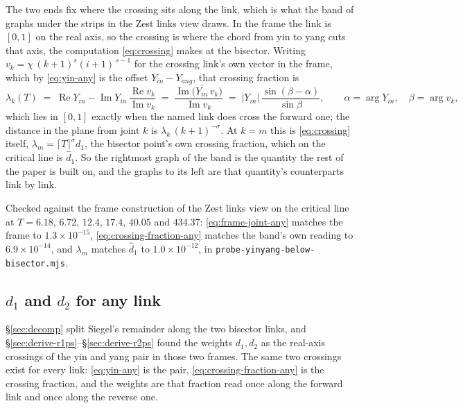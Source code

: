 \documentclass[11pt]{article}
\theoremstyle{definition}
\begin{document}
The two ends fix where the crossing sits along the link, which is what the band
of graphs under the strips in the Zest links view draws. In the frame the link
is $[0,1]$ on the real axis, so the crossing is where the chord from yin to
yang cuts that axis, the computation \eqref{eq:crossing} makes at the bisector.
Writing $v_k=\chi\,(k+1)^{s}(i+1)^{\,s-1}$ for the crossing link's own vector in
the frame, which by \eqref{eq:yin-any} is the offset $Y_{in}-Y_{ang}$, that
crossing fraction is
\begin{equation}\label{eq:crossing-fraction-any}
\lambda_k(T)
\;=\;\operatorname{Re}Y_{in}-\operatorname{Im}Y_{in}\,
\frac{\operatorname{Re}v_k}{\operatorname{Im}v_k}
\;=\;\frac{\operatorname{Im}\bigl(\overline{Y_{in}}\,v_k\bigr)}{\operatorname{Im}v_k}
\;=\;\bigl|Y_{in}\bigr|\,\frac{\sin(\beta-\alpha)}{\sin\beta},
\qquad
\alpha=\arg Y_{in},\quad \beta=\arg v_k,
\end{equation}
which lies in $[0,1]$ exactly when the named link does cross the forward one;
the distance in the plane from joint $k$ is $\lambda_k\,(k+1)^{-\sigma}$. At
$k=m$ this is \eqref{eq:crossing} itself, $\lambda_m=\lceil T\rceil^{\sigma}d_1$,
the bisector point's own crossing fraction, which on the critical line is
$\hat d_1$. So the rightmost graph of the band is the quantity the rest of the
paper is built on, and the graphs to its left are that quantity's counterparts
link by link.

Checked against the frame construction of the Zest links view on the critical
line at $T=6.18,\,6.72,\,12.4,\,17.4,\,40.05$ and $434.37$:
\eqref{eq:frame-joint-any} matches the frame to $1.3\times10^{-15}$,
\eqref{eq:crossing-fraction-any} matches the band's own reading to
$6.9\times10^{-14}$, and $\lambda_m$ matches $\hat d_1$ to $1.0\times10^{-12}$,
in \texttt{probe-yinyang-below-bisector.mjs}.

\subsection{\texorpdfstring{$d_1$ and $d_2$}{d1 and d2} for any link}\label{sec:d1-any}

\S\ref{sec:decomp} split Siegel's remainder along the two bisector links,
and \S\ref{sec:derive-r1ps}--\S\ref{sec:derive-r2ps} found the weights
$d_1,d_2$ as the real-axis crossings of the yin and yang pair in those two
frames. The same two crossings exist for every link: \eqref{eq:yin-any} is
the pair, \eqref{eq:crossing-fraction-any} is the crossing fraction, and the
weights are that fraction read once along the forward link and once along the
reverse one.
\end{document}
